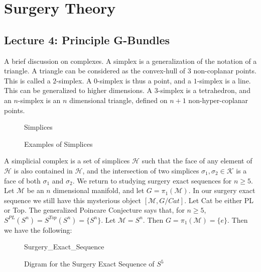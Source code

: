 \documentclass[crop=false,class=article,oneside]{standalone}
\begin{document}
    \ifx\ifmathcoursessurgery\undefined
        \section*{Surgery Theory}
        \setcounter{section}{1}
        \renewcommand\thesubfigure{%
            \arabic{section}.\arabic{figure}.\arabic{subfigure}%
        }
    \fi
    \subsection{Lecture 4: Principle G-Bundles}
        A brief discussion on complexes. A simplex
        is a generalization of the notation of a triangle.
        A triangle can be considered as the
        convex-hull of $3$ non-coplanar points.
        This is called a $2$-simplex. A $0$-simplex
        is thus a point, and a $1$-simplex is a line.
        This can be generalized to higher dimensions.
        A $3$-simplex is a tetrahedron,
        and an $n$-simplex is an $n$ dimensional triangle,
        defined on $n+1$ non-hyper-coplanar points.
        \begin{figure}[H]
            \centering
            \captionsetup{type=figure}
            {Simplices}
            \caption[%
                Surgery Theory - Simplices%
            ]{%
                Examples of Simplices%
            }
            \label{fig:surgery_theory_simplexes}
        \end{figure}
        A simplicial complex is a set of simplices
        $\mathcal{H}$ such that the face of any element
        of $\mathcal{H}$ is also contained in $\mathcal{H}$,
        and the intersection of two simplices
        $\sigma_{1},\sigma_{2}\in \mathcal{K}$ is a
        face of both $\sigma_{1}$ and $\sigma_{2}$.
        We return to studying surgery exact sequences
        for $n\geq 5$. Let $\mathcal{M}$ be an $n$
        dimensional manifold, and let $G = \pi_{1}(\mathcal{M})$.
        In our surgery exact sequence we still have this
        mysterious object $[\mathcal{M},G/Cat]$. Let Cat
        be either PL or Top. The generalized Poincare
        Conjecture says that, for $n\geq 5$,
        $S^{PL}(S^{n})=S^{Top}(S^{n})=\{S^{n}\}$.
        Let $\mathcal{M}=S^{n}$. Then
        $G=\pi_{1}(\mathcal{M})=\{e\}$.
        Then we have the following:
        \begin{figure}[H]
            \centering
            \captionsetup{type=figure}
            {Surgery_Exact_Sequence}
            \caption[%
                Surgery Theory - Diagram for Sequence
                of $S^{5}$%
            ]{%
                Digram for the Surgery Exact Sequence of $S^{5}$%
            }
            \label{%
                fig:surgery_theory_example_diagram_%
                for_surgery_exact_sequence%
            }
        \end{figure}
\end{document}
